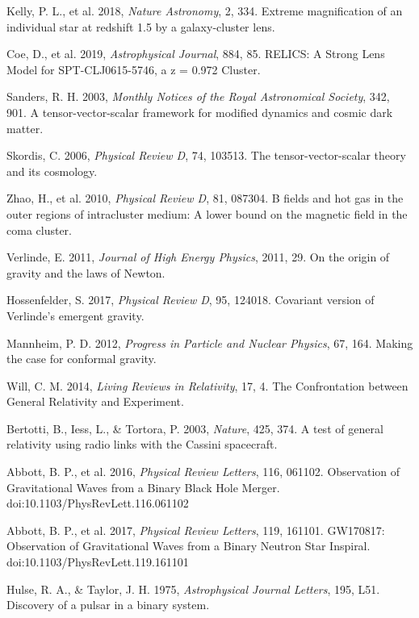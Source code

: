\documentclass[12pt,a4paper]{article}
\begin{document}
\begin{thebibliography}{99}
 Kelly, P. L., et al. 2018, \textit{Nature Astronomy}, 2, 334. Extreme magnification of an individual star at redshift 1.5 by a galaxy-cluster lens.

 Coe, D., et al. 2019, \textit{Astrophysical Journal}, 884, 85. RELICS: A Strong Lens Model for SPT-CLJ0615-5746, a z = 0.972 Cluster.

 Sanders, R. H. 2003, \textit{Monthly Notices of the Royal Astronomical Society}, 342, 901. A tensor-vector-scalar framework for modified dynamics and cosmic dark matter.

 Skordis, C. 2006, \textit{Physical Review D}, 74, 103513. The tensor-vector-scalar theory and its cosmology.

 Zhao, H., et al. 2010, \textit{Physical Review D}, 81, 087304. B fields and hot gas in the outer regions of intracluster medium: A lower bound on the magnetic field in the coma cluster.

 Verlinde, E. 2011, \textit{Journal of High Energy Physics}, 2011, 29. On the origin of gravity and the laws of Newton.

 Hossenfelder, S. 2017, \textit{Physical Review D}, 95, 124018. Covariant version of Verlinde's emergent gravity.

 Mannheim, P. D. 2012, \textit{Progress in Particle and Nuclear Physics}, 67, 164. Making the case for conformal gravity.

 Will, C. M. 2014, \textit{Living Reviews in Relativity}, 17, 4. The Confrontation between General Relativity and Experiment.

 Bertotti, B., Iess, L., \& Tortora, P. 2003, \textit{Nature}, 425, 374. A test of general relativity using radio links with the Cassini spacecraft.

 Abbott, B. P., et al. 2016, \textit{Physical Review Letters}, 116, 061102. Observation of Gravitational Waves from a Binary Black Hole Merger. doi:10.1103/PhysRevLett.116.061102

 Abbott, B. P., et al. 2017, \textit{Physical Review Letters}, 119, 161101. GW170817: Observation of Gravitational Waves from a Binary Neutron Star Inspiral. doi:10.1103/PhysRevLett.119.161101

 Hulse, R. A., \& Taylor, J. H. 1975, \textit{Astrophysical Journal Letters}, 195, L51. Discovery of a pulsar in a binary system.


\end{thebibliography}
\end{document}
